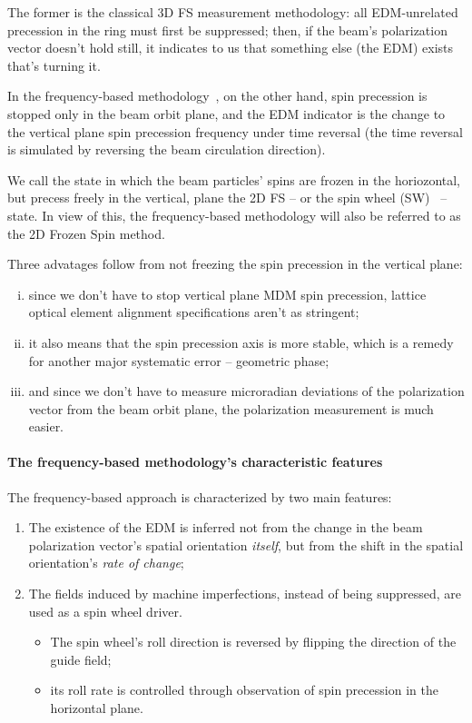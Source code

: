 \documentclass[]{elsarticle}
\begin{document}
The former is the classical 3D FS measurement methodology: all EDM-unrelated precession in the ring
must first be suppressed; then, if the beam's polarization vector doesn't hold still,
it indicates to us that something else (the EDM) exists that's turning it.

In the frequency-based methodology~\cite{Senichev:FDM}, on the other hand, spin precession
is stopped only in the beam orbit plane,
and the EDM indicator is the change to the vertical plane spin precession frequency under time reversal
(the time reversal is simulated by reversing the beam circulation direction).

We call the state in which the beam particles' spins are frozen in the horiozontal,
but precess freely in the vertical, plane the 2D FS -- or the spin wheel (SW)~\cite{Mane:SpinWheel} -- state.
In view of this, the frequency-based methodology will also be referred to as the 2D Frozen Spin method.

Three advatages follow from not freezing the spin precession in the vertical plane:
\begin{enumerate}[(i)]
\item since we don't have to stop vertical plane MDM spin precession, lattice optical element alignment
  specifications aren't as stringent;
\item it also means that the spin precession axis is more stable, which is a remedy for another major
  systematic error -- geometric phase;\label{itm:advantages:stability}
\item and since we don't have to measure microradian deviations of the polarization vector from the
  beam orbit plane, the polarization measurement is much easier.
\end{enumerate}

\paragraph{The frequency-based methodology's characteristic features}

The frequency-based approach is characterized by two main features:
\begin{enumerate}
\item The existence of the EDM is inferred not from the change in the beam polarization vector's
  spatial orientation \emph{itself}, but from the shift in the spatial orientation's \emph{rate of change};
\item The fields induced by machine imperfections, instead of being suppressed,
  are used as a spin wheel driver.
  \begin{itemize}
  \item The spin wheel's roll direction is reversed by flipping the direction of the guide field;
  \item its roll rate is controlled through observation of spin precession in the horizontal plane.
  \end{itemize}
\end{enumerate}
\end{document}
